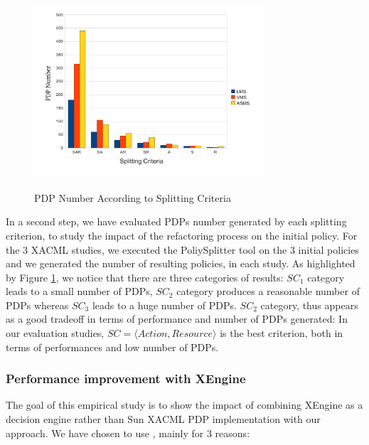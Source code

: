 \begin{figure}[!h]
  \centering
\includegraphics[width=8.5cm, height=7.2cm]{pdpnumber.pdf}
\begin{center}
\caption{PDP Number According to Splitting Criteria}
\label{pdpnumber}
\end{center}
\end{figure} 

In a second step, we have evaluated PDPs number generated by each splitting criterion, to study the impact of the refactoring process on the initial policy. 
For the 3 XACML studies, we executed the PoliySplitter tool on the 3 initial policies and we generated the number of resulting policies, in each study. 
As highlighted by Figure \ref{pdpnumber}, we notice that there are three
 categories of results: $SC_{1}$ category leads to a small number of PDPs, $SC_{2}$ category produces a reasonable number of PDPs whereas $SC_{3}$ leads to a huge 
number of PDPs. $SC_{2}$ category, thus appears as a good tradeoff in terms of performance and number of 
PDPs generated: In our evaluation studies, $SC=\langle Action, Resource\rangle$ is the best criterion, both in terms of performances and low number of PDPs.


\subsubsection{Performance improvement with XEngine}
The goal of this empirical study is to show the impact of combining XEngine as a decision engine rather than Sun XACML PDP implementation with our approach. 
We have chosen to use \cite{Xengine}, mainly for 3 reasons:

